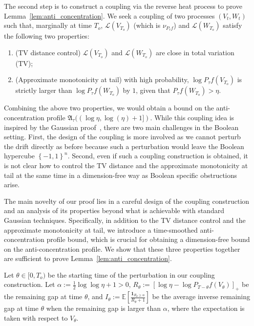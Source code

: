 \documentclass[11pt]{article}
\newcommand{\excess}{\alpha}
\newcommand{\fA}{\mathfrak{A}}
\newcommand{\uV}{V}
\newcommand{\uW}{W}
\newcommand{\To}{{T_o}}
\theoremstyle{named}
\theoremstyle{plain}
\newcommand{\defn}{:=}
\newcommand{\Exs}{\ensuremath{{\mathbb{E}}}}
\newcommand{\Law}{\mathcal{L}}
\newcommand{\brackets}[1]{\left[ #1 \right]}
\newcommand{\braces}[1]{\left\{ #1 \right \}}
\begin{document}
The second step is to construct a coupling via the reverse heat process to prove Lemma~\ref{lem:anti_concentration}. We seek a coupling of two processes $(\uV_t, \uW_t)$ such that, marginally at time $\To$, $\Law(\uV_{\To})$ (which is $\nu_{P_\tau f}$) and $\Law(\uW_{\To})$ satisfy the following two properties:
\begin{enumerate}
    \item (TV distance control) $\Law(\uV_{\To})$ and $\Law(\uW_{\To})$ are close in total variation (TV);
    \item (Approximate monotonicity at tail) with high probability, $\log P_\tau f(\uV_{\To})$ is strictly larger than $\log P_\tau f(\uW_{\To})$ by $1$, given that $P_\tau f(\uW_{\To}) > \eta$. 
\end{enumerate}
Combining the above two properties, we would obtain a bound on the anti-concentration profile $\fA_\tau((\log \eta, \log(\eta) + 1])$. While this coupling idea is inspired by the Gaussian proof~\cite{eldan2018regularization}, there are two main challenges in the Boolean setting. First, the design of the coupling is more involved as we cannot perturb the drift directly as before because such a perturbation would leave the Boolean hypercube $\braces{-1,1}^n$. Second, even if such a coupling construction is obtained, it is not clear how to control the TV distance and the approximate monotonicity at tail at the same time in a dimension-free way as Boolean specific obstructions arise.

The main novelty of our proof lies in a careful design of the coupling construction and an analysis of its properties beyond what is achievable with standard Gaussian techniques. 
Specifically, in addition to the TV distance control and the approximate monotonicity at tail, we introduce a time-smoothed anti-concentration profile bound, which is crucial for obtaining a dimension-free bound on the anti-concentration profile. We show that these three properties together are sufficient to prove Lemma~\ref{lem:anti_concentration}. 

Let $\theta \in [0, \To)$ be the starting time of the perturbation in our coupling construction. Let $\excess \defn \frac{1}{2} \log \log \eta + 1 > 0$, $R_\theta \defn [\log \eta - \log P_{T-\theta} f(\uV_\theta)]_+$ be the remaining gap at time $\theta$, and $I_\theta \defn \Exs\brackets{\frac{\mathbf{1}_{R_\theta \geq \excess}}{R_\theta + 1}}$ be the average inverse remaining gap at time $\theta$ when the remaining gap is larger than $\excess$, where the expectation is taken with respect to $\uV_\theta$.
\end{document}
